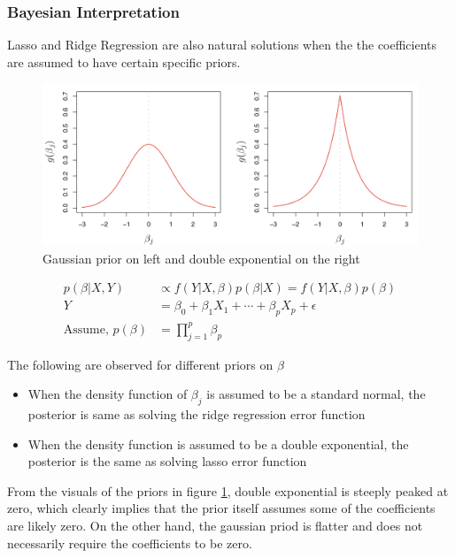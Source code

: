 \documentclass[11pt, a4paper]{article}
\begin{document}
    \subsubsection{Bayesian Interpretation}
    Lasso and Ridge Regression are also natural solutions when the the coefficients are assumed to have certain specific priors.\newline
    \begin{figure}[h]
        \includegraphics[scale=0.4]{lasso_bayes}
        \centering
        \caption {Gaussian prior on left and double exponential on the right}
        \label{fig:lasso_bayes}
    \end{figure}
    
    \begin{align*}
        p(\beta|X,Y) &\propto f(Y|X,\beta)p(\beta|X) = f(Y|X,\beta)p(\beta) \tag*{assuming X is constant}\\
        Y &= \beta_{0} + \beta_{1}X_{1} + \cdots + \beta_{p}X_{p} + \epsilon\\
        \text{Assume, } p(\beta) &= \prod_{j=1}^{p} \beta_{p} \tag*{for some density function $g$}  
    \end{align*}

    The following are observed for different priors on $\beta$

    \begin{itemize}
        \item When the density function of $\beta_{j}$ is assumed to be a standard normal, the posterior is same as solving the ridge regression error function
        \item When the density function is assumed to be a double exponential, the posterior is the same as solving lasso error function
    \end{itemize}

    From the visuals of the priors in figure \ref{fig:lasso_bayes}, double exponential is steeply peaked at zero, which clearly implies that the prior itself assumes some of the coefficients are likely zero. On the other hand, the gaussian priod is flatter and does not necessarily require the coefficients to be zero.
\end{document}
